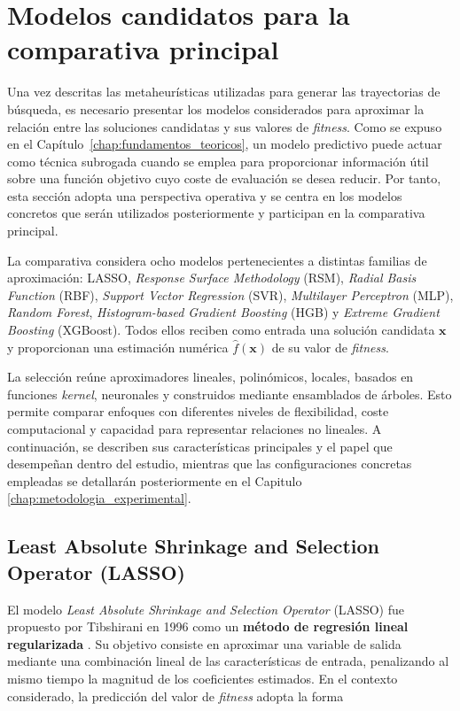 \section{Modelos candidatos para la comparativa principal}
\label{sec:modelos_candidatos_comparativa}

Una vez descritas las metaheurísticas utilizadas para generar las trayectorias de búsqueda, es necesario presentar los modelos considerados para aproximar la relación entre las soluciones candidatas y sus valores de \textit{fitness}. Como se expuso en el Capítulo~\ref{chap:fundamentos_teoricos}, un modelo predictivo puede actuar como técnica subrogada cuando se emplea para proporcionar información útil sobre una función objetivo cuyo coste de evaluación se desea reducir. Por tanto, esta sección adopta una perspectiva operativa y se centra en los modelos concretos que serán utilizados posteriormente y participan en la comparativa principal.

La comparativa considera ocho modelos pertenecientes a distintas familias de aproximación: LASSO, \textit{Response Surface Methodology} (RSM), \textit{Radial Basis Function} (RBF), \textit{Support Vector Regression} (SVR), \textit{Multilayer Perceptron} (MLP), \textit{Random Forest}, \textit{Histogram-based Gradient Boosting} (HGB) y \textit{Extreme Gradient Boosting} (XGBoost). Todos ellos reciben como entrada una solución candidata \(\mathbf{x}\) y proporcionan una estimación numérica \(\hat{f}(\mathbf{x})\) de su valor de \textit{fitness}.

La selección reúne aproximadores lineales, polinómicos, locales, basados en funciones \textit{kernel}, neuronales y construidos mediante ensamblados de árboles. Esto permite comparar enfoques con diferentes niveles de flexibilidad, coste computacional y capacidad para representar relaciones no lineales. A continuación, se describen sus características principales y el papel que desempeñan dentro del estudio, mientras que las configuraciones concretas empleadas se detallarán posteriormente en el Capitulo \ref{chap:metodologia_experimental}.

\subsection{Least Absolute Shrinkage and Selection Operator (LASSO)}

El modelo \textit{Least Absolute Shrinkage and Selection Operator} (LASSO) fue propuesto por Tibshirani en 1996 como un \textbf{método de regresión lineal regularizada} \cite{tibshirani1996lasso}. Su objetivo consiste en aproximar una variable de salida mediante una combinación lineal de las características de entrada, penalizando al mismo tiempo la magnitud de los coeficientes estimados. En el contexto considerado, la predicción del valor de \textit{fitness} adopta la forma

